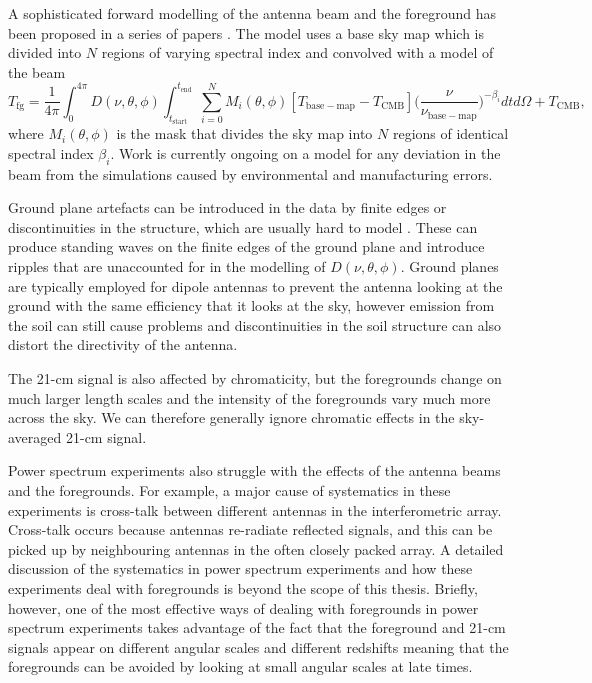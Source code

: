 A sophisticated forward modelling of the antenna beam and the foreground has been proposed in a series of papers \cite{Anstey_REACH_2021, Anstey_antenna_2022, Anstey_lst_2022}. The model uses a base sky map which is divided into $N$ regions of varying spectral index and convolved with a model of the beam
\begin{equation}
    T_\mathrm{fg} = \frac{1}{4\pi}\int_0^{4\pi} D(\nu, \theta, \phi) \int_{t_\mathrm{start}}^{t_\mathrm{end}} \sum_{i=0}^{N} M_{i}(\theta, \phi)[T_\mathrm{base-map} - T_\mathrm{CMB}]\bigg(\frac{\nu}{\nu_\mathrm{base-map}}\bigg)^{-\beta_i} dt d\Omega + T_\mathrm{CMB},
\end{equation}
where $M_i(\theta, \phi)$ is the mask that divides the sky map into $N$ regions of identical spectral index $\beta_i$. Work is currently ongoing on a model for any deviation in the beam from the simulations caused by environmental and manufacturing errors.

Ground plane artefacts can be introduced in the data by finite edges or discontinuities in the structure, which are usually hard to model \cite{Bradley_EDGES_2019}. These can produce standing waves on the finite edges of the ground plane and introduce ripples that are unaccounted for in the modelling of $D(\nu, \theta, \phi)$. Ground planes are typically employed for dipole antennas to prevent the antenna looking at the ground with the same efficiency that it looks at the sky, however emission from the soil can still cause problems and discontinuities in the soil structure can also distort the directivity of the antenna.

The 21-cm signal is also affected by chromaticity, but the foregrounds change on much larger length scales and the intensity of the foregrounds vary much more across the sky. We can therefore generally ignore chromatic effects in the sky-averaged 21-cm signal.

Power spectrum experiments also struggle with the effects of the antenna beams and the foregrounds. For example, a major cause of systematics in these experiments is cross-talk between different antennas in the interferometric array. Cross-talk occurs because antennas re-radiate reflected signals, and this can be picked up by neighbouring antennas in the often closely packed array. A detailed discussion of the systematics in power spectrum experiments and how these experiments deal with foregrounds is beyond the scope of this thesis. Briefly, however, one of the most effective ways of dealing with foregrounds in power spectrum experiments takes advantage of the fact that the foreground and 21-cm signals appear on different angular scales and different redshifts meaning that the foregrounds can be avoided by looking at small angular scales at late times. 

